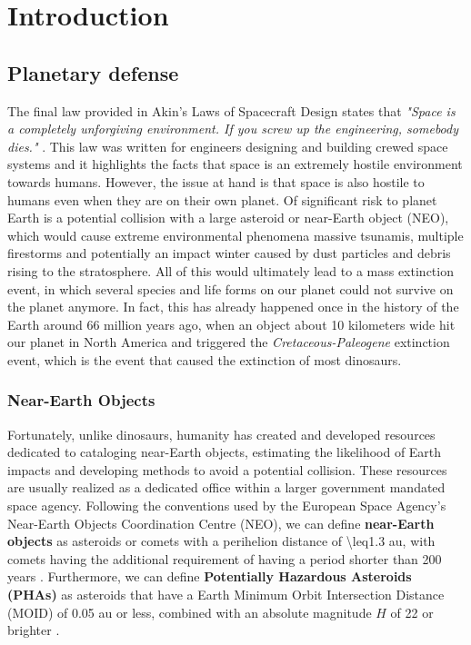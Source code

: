 \chapter{Introduction}

\section{Planetary defense}
\label{sec:planetary_defense}

The final law provided in Akin's Laws of Spacecraft Design states that \textit{"Space is a completely unforgiving environment. If you screw up the engineering, somebody dies."} \cite{akinslaws}. This law was written for engineers designing and building crewed space systems and it highlights the facts that space is an extremely hostile environment towards humans. However, the issue at hand is that space is also hostile to humans even when they are on their own planet. Of significant risk to planet Earth is a potential collision with a large asteroid or near-Earth object (NEO), which would cause extreme environmental phenomena massive tsunamis, multiple firestorms and potentially an impact winter caused by dust particles and debris rising to the stratosphere. All of this would ultimately lead to a mass extinction event, in which several species and life forms on our planet could not survive on the planet anymore. In fact, this has already happened once in the history of the Earth around 66 million years ago, when an object about 10 kilometers wide hit our planet in North America and triggered the \textit{Cretaceous-Paleogene} extinction event, which is the event that caused the extinction of most dinosaurs.

\subsection{Near-Earth Objects}
\label{ssec:neo}

Fortunately, unlike dinosaurs, humanity has created and developed resources dedicated to cataloging near-Earth objects, estimating the likelihood of Earth impacts and developing methods to avoid a potential collision. These resources are usually realized as a dedicated office within a larger government mandated space agency. Following the conventions used by the European Space Agency's Near-Earth Objects Coordination Centre (NEO), we can define \textbf{near-Earth objects} as asteroids or comets with a perihelion distance of \num{\leq1.3} \si{\astronomicalunit}, with comets having the additional requirement of having a period shorter than \num{200} years \cite{neo_definition}. Furthermore, we can define \textbf{Potentially Hazardous Asteroids (PHAs)} as asteroids that have a Earth Minimum Orbit Intersection Distance (MOID) of \num{0.05} \si{\astronomicalunit} or less, combined with an absolute magnitude $H$ of \num{22} or brighter \cite{neo_definition}. 


